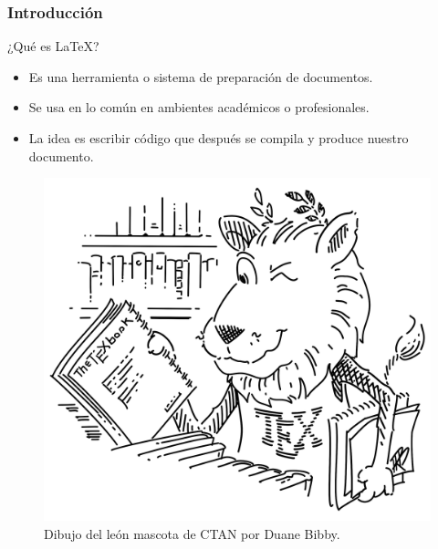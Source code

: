 \begin{frame}
\frametitle{Introducción}
    \begin{tcolorbox}[colframe=color1]
        \begin{center}
            ¿Qué es \LaTeX ?
        \end{center}
    \end{tcolorbox}
    
    \begin{itemize}
        \item Es una herramienta o sistema de preparación de documentos.
        \item Se usa en lo común en ambientes académicos o profesionales.
        \item La idea es escribir código que después se compila y produce nuestro documento.
        \end{itemize}    

    \begin{figure}[h]
        \centering
        \includegraphics[width=0.4\textheight]{../images/lion.png}
        \caption{Dibujo del león mascota de CTAN por Duane Bibby.}
    \end{figure}

\end{frame}

